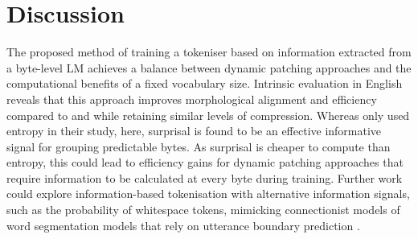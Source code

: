 

\section{Discussion}
\label{sec:discussion}

The proposed method of training a tokeniser based on information extracted from a byte-level LM achieves a balance between dynamic patching approaches and the computational benefits of a fixed vocabulary size. Intrinsic evaluation in English reveals that this approach improves morphological alignment and \renyi efficiency compared to \bpe and \bpewp while retaining similar levels of compression. Whereas \citet{pagnoni2024byte} only used entropy in their study, here, surprisal is found to be an effective informative signal for grouping predictable bytes. As surprisal is cheaper to compute than entropy, this could lead to efficiency gains for dynamic patching approaches that require information to be calculated at every byte during training. Further work could explore information-based tokenisation with alternative information signals, such as the probability of whitespace tokens, mimicking connectionist models of word segmentation models that rely on utterance boundary prediction \citep{christiansen1998learning}.

